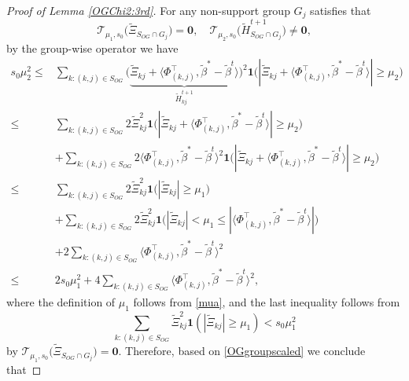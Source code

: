 \documentclass[12pt]{article}
\newtheorem{proof}{Proof}
\begin{document}
\begin{appendix}
\begin{proof}[Proof of Lemma \ref{OGChi2:3rd}]
    For any non-support group $G_j$ satisfies that
    $$\mathcal T_{\mu_{1},s_0} \big( \tilde \Xi_{S_{OG} \cap G_j}\big)=\mathbf 0,
    \quad \mathcal T_{\mu_{2},s_0} \big(\tilde H^{t+1}_{S_{OG} \cap G_j}\big) \ne \mathbf 0,$$
    by the group-wise operator %
    we have 
    \begin{equation}\label{OGgroupscaled}
        \begin{aligned}
        s_0\mu_2^2  
        \le& \sum_{k: (k,j) \in S_{OG}} \Big( \underbrace{\tilde \Xi_{kj} + \langle {\Phi}_{(k,j)}^\top, \tilde \beta^* -\tilde \beta^t \rangle}_{\tilde H_{kj}^{t+1}} \Big)^2  \mathbf1\Big( |\tilde \Xi_{kj} + \langle {\Phi}_{(k,j)}^\top, \tilde \beta^* -\tilde \beta^t \rangle| \ge \mu_2 \Big)\\
        \le& \sum_{k: (k,j) \in S_{OG}} 2 \tilde \Xi_{kj}^2 \mathbf1\Big( |\tilde \Xi_{kj}+\langle {\Phi}_{(k,j)}^\top, \tilde \beta^* -\tilde \beta^t \rangle |\ge\mu_2\Big) \\
        & +\sum_{k: (k,j) \in S_{OG}} 2 \langle {\Phi}_{(k,j)}^\top, \tilde \beta^* -\tilde \beta^t \rangle^2 \mathbf1\Big( |\tilde \Xi_{kj}+\langle {\Phi}_{(k,j)}^\top, \tilde \beta^* -\tilde \beta^t \rangle |\ge\mu_2\Big)\\
        \le& \sum_{k: (k,j) \in S_{OG}} 2 \tilde \Xi_{kj}^2 \mathbf1\Big( |\tilde \Xi_{kj}|\ge\mu_1\Big)\\
            &+ \sum_{k: (k,j) \in S_{OG}} 2 \tilde \Xi_{kj}^2 \mathbf1\Big( |\tilde \Xi_{kj}|<\mu_1 \le |\langle {\Phi}_{(k,j)}^\top, \tilde \beta^* -\tilde \beta^t \rangle|\Big)\\
         & + 2 \sum_{k: (k,j) \in S_{OG}} \langle {\Phi}_{(k,j)}^\top, \tilde \beta^* -\tilde \beta^t \rangle^2\\
        \le & 2s_0 \mu_1^2 + 4\sum_{k: (k,j) \in S_{OG}} \langle {\Phi}_{(k,j)}^\top, \tilde \beta^* -\tilde \beta^t \rangle^2,
        \end{aligned}
    \end{equation}
    where the definition of $\mu_1$ follows from \eqref{mua}, and the last inequality follows from 
    $$\sum_{k: (k,j) \in S_{OG}} \tilde \Xi_{kj}^2 \mathbf1 (|\tilde \Xi_{kj}|\ge \mu_1)< s_0\mu_1^2$$
    by $\mathcal T_{\mu_{1},s_0} \big( \tilde \Xi_{S_{OG} \cap G_j}\big)=\mathbf 0$.
    Therefore, based on \eqref{OGgroupscaled} we conclude that 

\end{proof}
\end{appendix}
\end{document}

